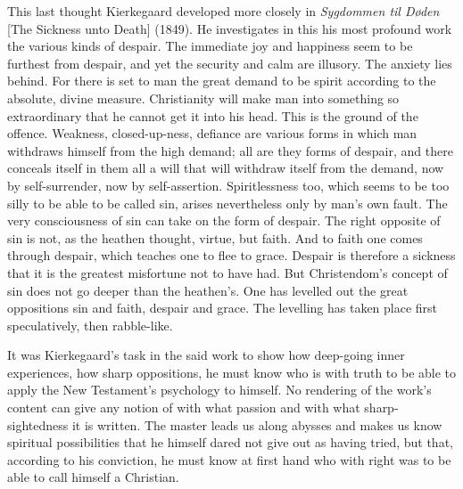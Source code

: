 \documentclass[12pt,a4paper]{book}
\newcommand{\opage}[1]{\marginnote{\footnotesize\textit{[#1]}}}
\begin{document}
\opage{163}This last thought Kierkegaard developed more closely in \emph{Sygdommen til Døden} [The Sickness
unto Death] (1849). He investigates in this his most profound work the various kinds of despair.
The immediate joy and happiness seem to be furthest from despair, and yet the security and calm
are illusory. The anxiety lies behind. For there is set to man the great demand to be spirit
according to the absolute, divine measure. Christianity will make man into something so
extraordinary that he cannot get it into his head. This is the ground of the offence. Weakness,
closed-up-ness, defiance are various forms in which man withdraws himself from the high demand;
all are they forms of despair, and there conceals itself in them all a will that will withdraw
itself from the demand, now by self-surrender, now by self-assertion. Spiritlessness too, which
seems to be too silly to be able to be called sin, arises nevertheless only by man's own fault.
The very consciousness of sin can take on the form of despair. The right opposite of sin is not,
as the heathen thought, virtue, but faith. And to faith one comes through despair, which teaches
one to flee to grace. Despair is therefore a sickness that it is the greatest misfortune not to
have had. But Christendom's concept of sin does not go deeper than the heathen's. One has levelled
out the great oppositions sin and faith, despair and grace. The levelling has taken place first
speculatively, then rabble-like.

It was Kierkegaard's task in the said work to show how deep-going inner experiences, how sharp
oppositions, he must know who is with truth to be able to apply the New Testament's psychology to
himself. No rendering of the work's content can give any notion of with what passion and with
what sharp-sightedness it is written. The master leads us along abysses and makes us know spiritual
possibilities that he himself dared not give out as having tried, but that, according to his
conviction, he must know at first hand who with right was to be able to call himself a Christian.
\end{document}
